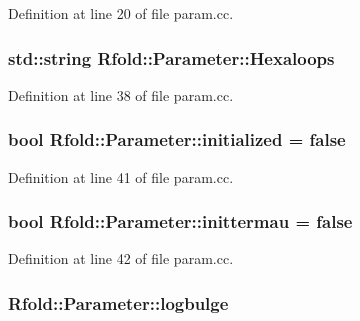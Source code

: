 Definition at line 20 of file param.\+cc.

\hypertarget{namespace_rfold_1_1_parameter_a04c094fec1c14c49a01196be486d4883}{
\subsubsection[{Hexaloops}]{\setlength{\rightskip}{0pt plus 5cm}std\+::string Rfold\+::\+Parameter\+::\+Hexaloops}}\label{namespace_rfold_1_1_parameter_a04c094fec1c14c49a01196be486d4883}


Definition at line 38 of file param.\+cc.

\hypertarget{namespace_rfold_1_1_parameter_a34bb77f761084f77aeb4768d23fac3a1}{
\subsubsection[{initialized}]{\setlength{\rightskip}{0pt plus 5cm}bool Rfold\+::\+Parameter\+::initialized = false}}\label{namespace_rfold_1_1_parameter_a34bb77f761084f77aeb4768d23fac3a1}


Definition at line 41 of file param.\+cc.

\hypertarget{namespace_rfold_1_1_parameter_a634f9d3c0bb311c6f2fe39b7f32796d2}{
\subsubsection[{inittermau}]{\setlength{\rightskip}{0pt plus 5cm}bool Rfold\+::\+Parameter\+::inittermau = false}}\label{namespace_rfold_1_1_parameter_a634f9d3c0bb311c6f2fe39b7f32796d2}


Definition at line 42 of file param.\+cc.

\hypertarget{namespace_rfold_1_1_parameter_a20e8624e389beca2f1df6a9aebc9bbe2}{
\subsubsection[{logbulge}]{ Rfold\+::\+Parameter\+::logbulge}}\label{namespace_rfold_1_1_parameter_a20e8624e389beca2f1df6a9aebc9bbe2}


